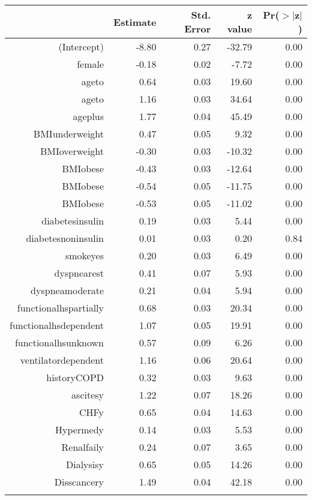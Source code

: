 \bigskip\bigskip
\centering
\begin{tabular}{rrrrr}
  \hline
 & Estimate & Std. Error & z value & Pr($>$$|$z$|$) \\ 
  \hline
(Intercept) & -8.80 & 0.27 & -32.79 & 0.00 \\ 
  female & -0.18 & 0.02 & -7.72 & 0.00 \\ 
  age\-65\-to\-74 & 0.64 & 0.03 & 19.60 & 0.00 \\ 
  age\-75\-to\-84 & 1.16 & 0.03 & 34.64 & 0.00 \\ 
  age\-85\-plus & 1.77 & 0.04 & 45.49 & 0.00 \\ 
  BMI\-underweight & 0.47 & 0.05 & 9.32 & 0.00 \\ 
  BMI\-overweight & -0.30 & 0.03 & -10.32 & 0.00 \\ 
  BMI\-obese\-1 & -0.43 & 0.03 & -12.64 & 0.00 \\ 
  BMI\-obese\-2 & -0.54 & 0.05 & -11.75 & 0.00 \\ 
  BMI\-obese\-3 & -0.53 & 0.05 & -11.02 & 0.00 \\ 
  diabetes\-insulin & 0.19 & 0.03 & 5.44 & 0.00 \\ 
  diabetes\-noninsulin & 0.01 & 0.03 & 0.20 & 0.84 \\ 
  smoke\-yes & 0.20 & 0.03 & 6.49 & 0.00 \\ 
  dyspnea\-rest & 0.41 & 0.07 & 5.93 & 0.00 \\ 
  dyspnea\-moderate & 0.21 & 0.04 & 5.94 & 0.00 \\ 
  functional\-hs\-partially & 0.68 & 0.03 & 20.34 & 0.00 \\ 
  functional\-hs\-dependent & 1.07 & 0.05 & 19.91 & 0.00 \\ 
  functional\-hs\-unknown & 0.57 & 0.09 & 6.26 & 0.00 \\ 
  ventilator\-dependent & 1.16 & 0.06 & 20.64 & 0.00 \\ 
  history\-COPD & 0.32 & 0.03 & 9.63 & 0.00 \\ 
  ascites\-y & 1.22 & 0.07 & 18.26 & 0.00 \\ 
  CHF\-y & 0.65 & 0.04 & 14.63 & 0.00 \\ 
  Hyper\-med\-y & 0.14 & 0.03 & 5.53 & 0.00 \\ 
  Renal\-fail\-y & 0.24 & 0.07 & 3.65 & 0.00 \\ 
  Dialysis\-y & 0.65 & 0.05 & 14.26 & 0.00 \\ 
  Diss\-cancer\-y & 1.49 & 0.04 & 42.18 & 0.00 \\ 
$$
\end{tabular}
